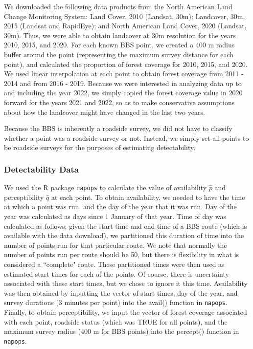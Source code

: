 \documentclass[12pt]{article}
\begin{document}
\par We downloaded the following data products from the North American Land Change Monitoring System: Land Cover, 2010 (Landsat, 30m); Landcover, 30m, 2015 (Landsat and RapidEye); and North American Land Cover, 2020 (Landsat, 30m).
Thus, we were able to obtain landcover at 30m resolution for the years 2010, 2015, and 2020. 
For each known BBS point, we created a 400 m radius buffer around the point (representing the maximum survey distance for each point), and calculated the proportion of forest coverage for 2010, 2015, and 2020. 
We used linear interpolation at each point to obtain forest coverage from 2011 - 2014 and from 2016 - 2019. 
Because we were interested in analyzing data up to and including the year 2022, we simply copied the forest coverage value in 2020 forward for the years 2021 and 2022, so as to make conservative assumptions about how the landcover might have changed in the last two years.

\par Because the BBS is inherently a roadside survey, we did not have to classify whether a point was a roadside survey or not.
Instead, we simply set all points to be roadside surveys for the purposes of estimating detectability.

\subsubsection{Detectability Data}

\par We used the R package \texttt{napops} \citep{edwards_napops_2024} to calculate the value of availability $\hat{p}$ and perceptibility $\hat{q}$ at each point.
To obtain availability, we needed to have the time at which a point was run, and the day of the year that it was run.
Day of the year was calculated as days since 1 January of that year.
Time of day was calculated as follows: given the start time and end time of a BBS route (which is available with the data download), we partitioned this duration of time into the number of points run for that particular route.
We note that normally the number of points run per route should be 50, but there is flexibility in what is considered a ``complete" route.
These partitioned times were then used as estimated start times for each of the points. 
Of course, there is uncertainty associated with these start times, but we chose to ignore it this time.
Availability was then obtained by inputting the vector of start times, day of the year, and survey durations (3 minutes per point) into the avail() function in \texttt{napops}.
Finally, to obtain perceptibility, we input the vector of forest coverage associated with each point, roadside status (which was TRUE for all points), and the maximum survey radius (400 m for BBS points) into the percept() function in \texttt{napops}.
\end{document}
